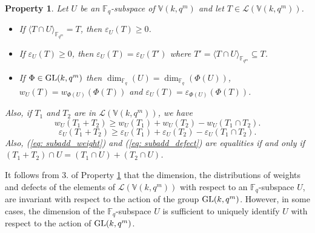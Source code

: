 \documentclass[11pt]{amsart}
\newtheorem{property}[theorem]{Property}
\newcommand{\fqm}{\mathbb{F}_{q^m}}
\newcommand{\F}{{\mathbb F}}
\newcommand{\GL}{\hbox{{\rm GL}}}
\newcommand{\fq}{{\mathbb F}_{q}}
\begin{document}
\begin{property} \label{property:defect}
  Let $U$ be an $\fq$-subspace of $\mathbb{V}(k,q^m)$ and let $T\in {\mathcal L}(\mathbb{V}(k,q^m))$.  
  \begin{itemize}
    \item[1.] If $\langle T\cap U \rangle_{\fqm}=T$, then $\varepsilon_U(T)\geq 0$.
    \item[2.] If $\varepsilon_U(T)\geq 0$, then $\varepsilon_U(T)= \varepsilon_U(T')$ where $T'=\langle T\cap U \rangle_{\fqm} \subseteq T$.
    \item[3.] If $\Phi \in \GL(k,q^m)$ then $\dim_{\fq}(U)=\dim_{\fq}(\Phi(U))$,   $ w_U(T)=w_{\Phi(U)}(\Phi(T))$ and  $\varepsilon_U(T)=\varepsilon_{\Phi(U)}(\Phi(T))$.
    \end{itemize}
    Also, if $T_1$ and $T_2$ are in  ${\mathcal L}(\mathbb{V}(k,q^m))$, we have 
    \begin{equation} \label{eq: subadd_weight}
       w_U(T_1+T_2)\geq  w_U(T_1)+w_U(T_2)-w_U(T_1\cap T_2). 
        \end{equation}
    \begin{equation} \label{eq: subadd_defect}
       \varepsilon_U(T_1+T_2)\geq  \varepsilon_U(T_1)+\varepsilon_U(T_2)-\varepsilon_U(T_1\cap T_2).    
        \end{equation}
 Also,  (\ref{eq: subadd_weight})  and (\ref{eq: subadd_defect}) are equalities if and only if $(T_1+T_2)\cap U=(T_1\cap U)+(T_2\cap U)$.
\end{property}

It follows from $3.$ of Property \ref{property:defect} that the dimension, the distributions of  weights and  defects of the elements of ${\mathcal L}(\mathbb{V}(k,q^m))$ with respect to an $\fq$-subspace $U$,  are invariant with respect to the action of the group $\GL(k,q^m)$. 
However, in some cases,  the dimension of the $\F_q$-subspace $U$  is sufficient to uniquely identify $U$ with respect to the action of $\GL(k,q^m)$. 
\end{document}
